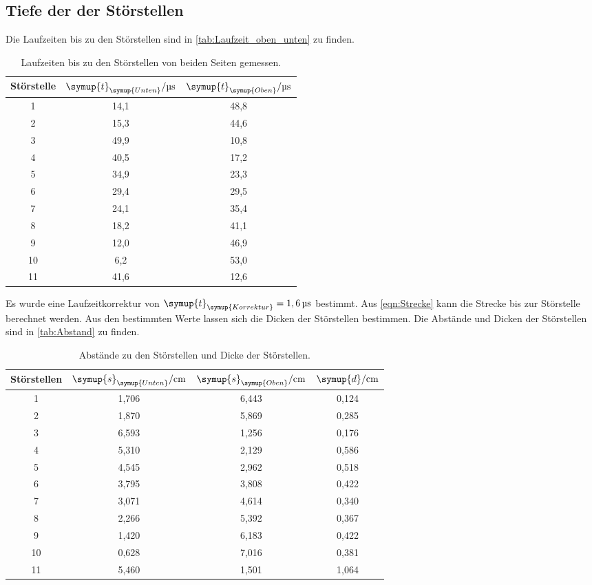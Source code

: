 \subsection{Tiefe der der Störstellen}
\label{sec:Tiefe}
Die Laufzeiten bis zu den Störstellen sind in \autoref{tab:Laufzeit_oben_unten} zu finden.
\begin{table}
  \centering
  \begin{tabular}{c c c }
    \toprule
    Störstelle & $\symup{t}_{\symup{Unten}}/\unit{\micro\second}$ & $\symup{t}_{\symup{Oben}}/\unit{\micro\second}$\\
    \midrule
     1 & 14,1 & 48,8 \\
     2 & 15,3 & 44,6 \\
     3 & 49,9 & 10,8 \\
     4 & 40,5 & 17,2 \\
     5 & 34,9 & 23,3 \\
     6 & 29,4 & 29,5 \\
     7 & 24,1 & 35,4 \\
     8 & 18,2 & 41,1 \\
     9 & 12,0 & 46,9 \\
    10 &  6,2 & 53,0 \\
    11 & 41,6 & 12,6 \\
    \bottomrule
  \end{tabular}
  \caption{Laufzeiten bis zu den Störstellen von beiden Seiten gemessen.}
  \label{tab:Laufzeit_oben_unten}
\end{table}
Es wurde eine Laufzeitkorrektur von $\symup{t}_{\symup{Korrektur}} = 1,6\,\unit{\micro\second}$ bestimmt.
Aus \autoref{eqn:Strecke} kann die Strecke bis zur Störstelle berechnet werden. Aus den bestimmten Werte lassen sich
die Dicken der Störstellen bestimmen. Die Abstände und Dicken der Störstellen sind in \autoref{tab:Abstand} zu finden.
\begin{table}
  \centering
  \begin{tabular}{c c c c}
    \toprule
    Störstellen & $\symup{s}_{\symup{Unten}}/\unit{\centi\meter}$ & $\symup{s}_{\symup{Oben}}/\unit{\centi\meter}$ & $\symup{d}/\unit{\centi\meter}$ \\
    \midrule
     1 & 1,706 & 6,443 & 0,124 \\
     2 & 1,870 & 5,869 & 0,285 \\
     3 & 6,593 & 1,256 & 0,176 \\
     4 & 5,310 & 2,129 & 0,586 \\
     5 & 4,545 & 2,962 & 0,518 \\
     6 & 3,795 & 3,808 & 0,422 \\
     7 & 3,071 & 4,614 & 0,340 \\
     8 & 2,266 & 5,392 & 0,367 \\
     9 & 1,420 & 6,183 & 0,422 \\
    10 & 0,628 & 7,016 & 0,381 \\
    11 & 5,460 & 1,501 & 1,064 \\
    \bottomrule
  \end{tabular}
  \caption{Abstände zu den Störstellen und Dicke der Störstellen.}
  \label{tab:Abstand}
\end{table}

